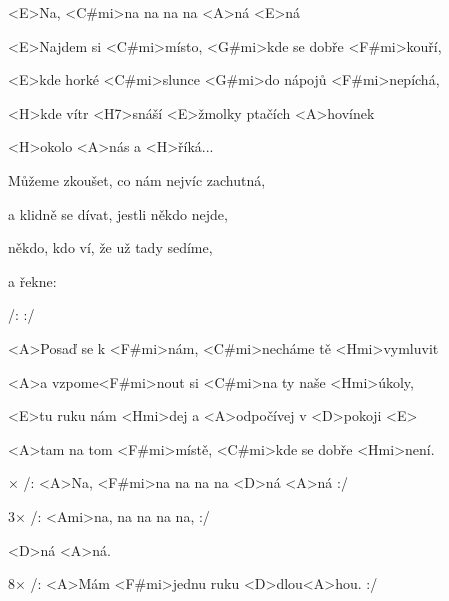 

<E>Na, <C#mi>na na na na <A>ná <E>ná

\zs
<E>Najdem si <C#mi>místo, <G#mi>kde se dobře <F#mi>kouří,

<E>kde horké <C#mi>slunce <G#mi>do nápojů <F#mi>nepíchá,

<H>kde vítr <H7>snáší <E>žmolky ptačích <A>hovínek

<H>okolo <A>nás a <H>říká...
\ks

\zs
Můžeme zkoušet, co nám nejvíc zachutná,

a klidně se dívat, jestli někdo nejde,

někdo, kdo ví, že už tady sedíme,

a řekne: 
\ks

\zr
/:  :/
\kr

\zs
<A>Posaď se k <F#mi>nám, <C#mi>necháme tě <Hmi>vymluvit

<A>a vzpome<F#mi>nout si <C#mi>na ty naše <Hmi>úkoly,

<E>tu ruku nám <Hmi>dej a <A>odpočívej v <D>pokoji 
<E>

\bigskip

<A>tam na tom <F#mi>místě, <C#mi>kde se dobře <Hmi>není.
\ks

× /: <A>Na, <F#mi>na na na na <D>ná <A>ná :/

3× /: <Ami>na, na na na na, :/

<D>ná <A>ná.

8× /: <A>Mám <F#mi>jednu ruku <D>dlou<A>hou. :/
\kr

\kp
